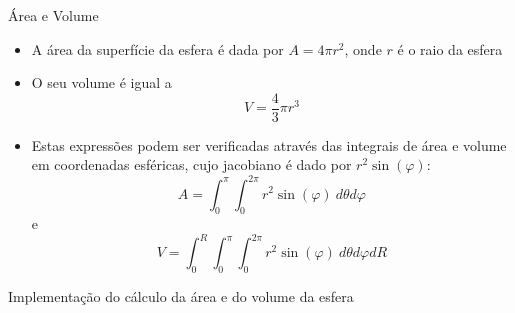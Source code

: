 \begin{frame}[fragile]{Área e Volume}

    \begin{itemize}
        \item A área da superfície da esfera é dada por $A = 4\pi r^2$, onde $r$ é o raio
            da esfera
        \pause

        \item O seu volume é igual a 
        \[
            V = \frac{4}{3}\pi r^3
        \]
        \pause

        \item Estas expressões podem ser verificadas através das integrais de área e volume 
            em coordenadas esféricas, cujo jacobiano é dado por $r^2\sin(\varphi)$:
        \[
            A = \int_0^\pi \int_0^{2\pi} r^2\sin(\varphi)\ d\theta d\varphi
        \]
        e
        \[
            V = \int_0^R \int_0^\pi \int_0^{2\pi} r^2\sin(\varphi)\ d\theta d\varphi dR
        \]

    \end{itemize}

\end{frame}

\begin{frame}[fragile]{Implementação do cálculo da área e do volume da esfera}
\end{frame}
